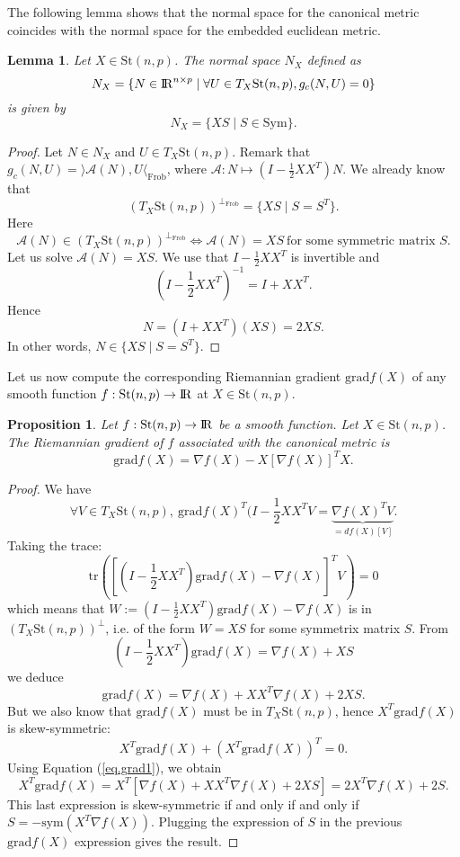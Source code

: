 \documentclass[10pt,a4paper]{book}
\theoremstyle{definition}
\theoremstyle{plain}
\newtheorem{prop}{Proposition}[section]
\newtheorem{lma}{Lemma}[section]
\theoremstyle{remark}
\newcommand{\grad}{\textrm{grad}}
\newcommand \Stif {\textrm{St}}
\def\R{{\rm I\kern-0.16em R}}
\begin{document}
The following lemma shows that the normal space for the canonical metric coincides with the normal space for the embedded euclidean metric.
\begin{lma}
Let $X\in \Stif(n,p)$. The normal space $N_X$ defined as 
$$N_X=\{N \in \R^{n\times p} \mid \forall U \in T_X\Stif(n,p), g_c(N,U)= 0\}$$
is given by
$$N_X=\{XS \mid S \in \text{Sym}\}.$$
\end{lma}
\begin{proof}Let $N\in N_X$ and $U \in T_X\Stif(n,p)$. 
Remark that
$g_c(N,U)=\rangle \mathcal{A}(N),U\langle_{\text{Frob}}$, where $\mathcal{A}:N\mapsto (I-\frac{1}{2}XX^T)N$. We already know that
$$(T_X\Stif(n,p))^{\bot_{\text{Frob}}}=\{XS \mid S=S^T\}.$$
Here
$$\mathcal{A}(N)\in (T_X\Stif(n,p))^{\bot_{\text{Frob}}} \iff \mathcal{A}(N)=XS~\text{for some symmetric matrix }S.$$
Let us solve $\mathcal{A}(N)=XS$. We use that $I-\frac{1}{2}XX^T$ is invertible and
$$(I-\frac{1}{2}XX^T)^{-1}=I+XX^T.$$
Hence
$$N=(I+XX^T)(XS)=2XS.$$
In other words, $N \in \{XS \mid S=S^{T}\}$. 
\end{proof}


Let us now compute the corresponding Riemannian gradient $\grad f(X)$ of any smooth function $f:\Stif(n,p)\to \R$ at $X\in \Stif(n,p)$. 
\begin{prop}
Let $f:\Stif(n,p)\to \R$ be a smooth function.  Let $X\in \Stif(n,p)$. The Riemannian gradient of $f$ associated with the canonical metric is
$$\grad f(X)=\nabla f(X)-X[\nabla f(X)]^T X.$$
\end{prop}
\begin{proof}
We have
$$\forall V\in T_X\Stif(n,p),~\grad f(X)^T(I-\frac{1}{2}XX^{T}V=\underbrace{\nabla f(X)^{T}V}_{=df(X)[V]}.$$
Taking the trace:
$$\text{tr}\left(\left[(I-\frac{1}{2}XX^{T})\grad f(X)-\nabla f(X) \right]^TV\right)=0$$
which means that $W:=(I-\frac{1}{2}XX^{T})\grad f(X)-\nabla f(X)$ is in $(T_X\Stif(n,p))^{\bot}$, i.e. of the form $W=XS$ for some symmetrix matrix $S$.
From
$$(I-\frac{1}{2}XX^T)\grad f(X)=\nabla f(X)+XS$$
we deduce
\begin{equation}\label{eq.grad1}
\grad f(X)=\nabla f(X)+XX^{T}\nabla f(X)+2XS.
\end{equation}
But we also know that $\grad f(X)$ must be in $T_X\Stif(n,p)$, hence
$X^{T}\grad f(X)$ is skew-symmetric:
$$X^T\grad f(X)+(X^T\grad f(X))^T=0.$$
Using Equation (\ref{eq.grad1}), we obtain
$$X^T\grad f(X)=X^T\left[\nabla f(X)+XX^{T}\nabla f(X)+2XS\right]=2X^T\nabla f(X)+2S.$$
This last expression is skew-symmetric if and only if and only if $S=-\text{sym}(X^T\nabla f(X))$. Plugging the expression of $S$ in  the previous $\grad f(X)$ expression gives the result.
\end{proof}
\end{document}
